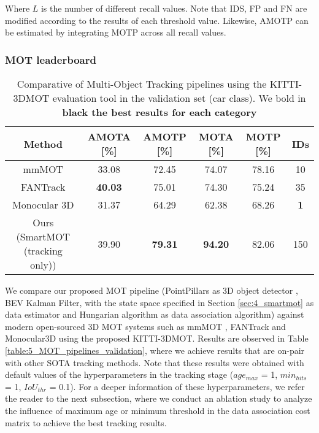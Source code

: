 Where $L$ is the number of different recall values. Note that IDS, FP and FN are modified according to the results of each threshold value. Likewise, AMOTP can be estimated by integrating MOTP across all recall values.

\subsubsection{MOT leaderboard}
\label{subsubsec:4_mot_leaderboard}

\begin{table}[h]
	\caption{Comparative of Multi-Object Tracking pipelines using the KITTI-3DMOT evaluation tool in the validation set (car class). We bold in \bf{black} the best results for each category}
	\label{table:4_MOT_pipelines_validation}
	\begin{center}
		\begin{tabular}{c | ccccc}
			\toprule
			Method & AMOTA [\%] &  AMOTP [\%] &  MOTA [\%] &  MOTP [\%] & IDs \\
			\midrule
			mmMOT \cite{zhang2019robust} & 33.08 & 72.45 & 74.07 & 78.16 & 10  \\
			FANTrack \cite{baser2019fantrack} & \bf{40.03} & 75.01 & 74.30 & 75.24 & 35 \\
			Monocular 3D \cite{weng2019monocular} & 31.37 & 64.29 & 62.38 & 68.26 & \bf{1} \\
			\midrule
			Ours (SmartMOT \cite{gomez2021smartmot} (tracking only)) & 39.90 & \bf{79.31} & \bf{94.20} & 82.06 & 150 \\ 
			\bottomrule
		\end{tabular}
	\end{center}
\end{table}

We compare our proposed \ac{MOT} pipeline (PointPillars as 3D object detector \cite{lang2019pointpillars}, \ac{BEV} Kalman Filter, with the state space specified in Section \ref{sec:4_smartmot} as data estimator and Hungarian algorithm as data association algorithm) against modern open-sourced 3D MOT systems such as mmMOT \cite{zhang2019robust}, FANTrack \cite{baser2019fantrack} and Monocular3D \cite{weng2019monocular} using the proposed KITTI-3DMOT. Results are observed in Table \ref{table:5_MOT_pipelines_validation}, where we achieve results that are on-pair with other \ac{SOTA} tracking methods. Note that these results were obtained with default values of the hyperparameters in the tracking stage ($age_{max}$ = 1, $min_{hits}$ = 1, $IoU_{thr}$ = 0.1). For a deeper information of these hyperparameters, we refer the reader to the next subsection, where we conduct an ablation study to analyze the influence of maximum age or minimum threshold in the data association cost matrix to achieve the best tracking results.

